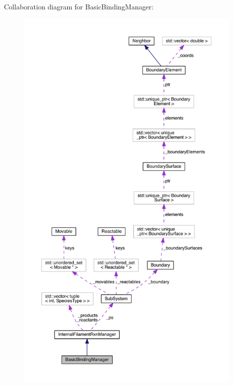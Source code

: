 Collaboration diagram for Basic\+Binding\+Manager\+:\nopagebreak
\begin{figure}[H]
\begin{center}
\leavevmode
\includegraphics[height=550pt]{classBasicBindingManager__coll__graph}
\end{center}
\end{figure}

